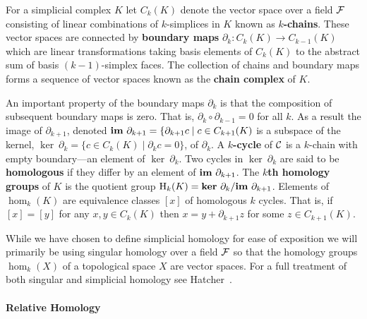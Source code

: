 
For a simplicial complex $K$ let $C_k(K)$ denote the vector space over a field $\mathcal{F}$ consisting of linear combinations of $k$-simplices in $K$ known as \textbf{$k$-chains}.
These vector spaces are connected by \textbf{boundary maps} $\partial_k:C_k(K)\to C_{k-1}(K)$ which are linear transformations taking basis elements of $C_k(K)$ to the abstract sum of basis $(k-1)$-simplex faces.
The collection of chains and boundary maps forms a sequence of vector spaces known as the \textbf{chain complex} of $K$.

An important property of the boundary maps $\partial_k$ is that the composition of subsequent boundary maps is zero.
That is, $\partial_k\circ\partial_{k-1} = 0$ for all $k$.
As a result the image of $\partial_{k+1}$, denoted $\mathbf{im}~\partial_{k+1} = \{\partial_{k+1}c\mid c\in C_{k+1}(K)$ is a subspace of the kernel, $\ker~\partial_k = \{c\in C_k(K)\mid \partial_k c = 0\}$, of $\partial_k$.
A \textbf{$k$-cycle} of $\mathcal{C}$ is a $k$-chain with empty boundary---an element of $\ker~\partial_k$.
Two cycles in $\ker~\partial_k$ are said to be \textbf{homologous} if they differ by an element of $\mathbf{im}~\partial_{k+1}$.
The \textbf{$k$th homology groups} of $K$ is the quotient group $\mathrm{H}_k(K) = \mathbf{ker}~\partial_k/\mathbf{im}~\partial_{k+1}$.
Elements of $\hom_k(K)$ are equivalence classes $[x]$ of homologous $k$ cycles.
That is, if $[x] = [y]$ for any $x,y\in C_k(K)$ then $x = y +\partial_{k+1}z$ for some $z\in C_{k+1}(K)$.



While we have chosen to define simplicial homology for ease of exposition we will primarily be using singular homology over a field $\mathcal{F}$ so that the homology groups $\hom_k(X)$ of a topological space $X$ are vector spaces.
For a full treatment of both singular and simplicial homology see Hatcher~\cite{hatcher01}.

\paragraph{Relative Homology}

